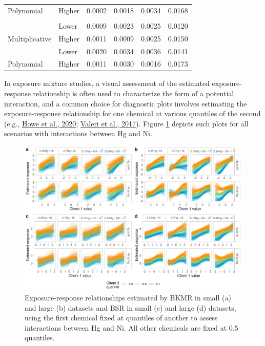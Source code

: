 \documentclass[12pt, twoside]{amherstthesis}
\begin{document}
\begin{table}
\begin{tabular}[t]{llcccc}
\multirow{-2}{*}{\raggedright\arraybackslash \hspace{1em}Polynomial} & Higher & 0.0002 & 0.0018 & 0.0034 & 0.0168\\
\addlinespace
\addlinespace[0.3em]
\multicolumn{6}{l}{\textbf{Ni-Co}}\\
 & Lower & 0.0009 & 0.0023 & 0.0025 & 0.0120\\

\multirow{-2}{*}{\raggedright\arraybackslash \hspace{1em}Multiplicative} & Higher & 0.0011 & 0.0009 & 0.0025 & 0.0150\\
\addlinespace
 & Lower & 0.0020 & 0.0034 & 0.0036 & 0.0141\\

\multirow{-2}{*}{\raggedright\arraybackslash \hspace{1em}Polynomial} & Higher & 0.0011 & 0.0030 & 0.0016 & 0.0173\\
\bottomrule
\end{tabular}
\end{table}
In exposure mixture studies, a visual assessment of the estimated exposure-response relationship is often used to characterize the form of a potential interaction, and a common choice for diagnostic plots involves estimating the exposure-response relationship for one chemical at various quantiles of the second (e.g., \protect\hyperlink{ref-howe_prenatal_2020}{Howe et al., 2020}; \protect\hyperlink{ref-valeri_joint_2017}{Valeri et al., 2017}). Figure \ref{fig:hgnibiv} depicts such plots for all scenarios with interactions between Hg and Ni.
\begin{figure}

{\centering \includegraphics[width=1\linewidth]{figures/ch4_hgni_biv} 

}

\caption{Exposure-response relationships estimated by BKMR in small (a) and large (b) datasets and BSR in small (c) and large (d) datasets, using the first chemical fixed at quantiles of another to assess interactions between Hg and Ni. All other chemicals are fixed at 0.5 quantiles.}\label{fig:hgnibiv}
\end{figure}
\end{document}
